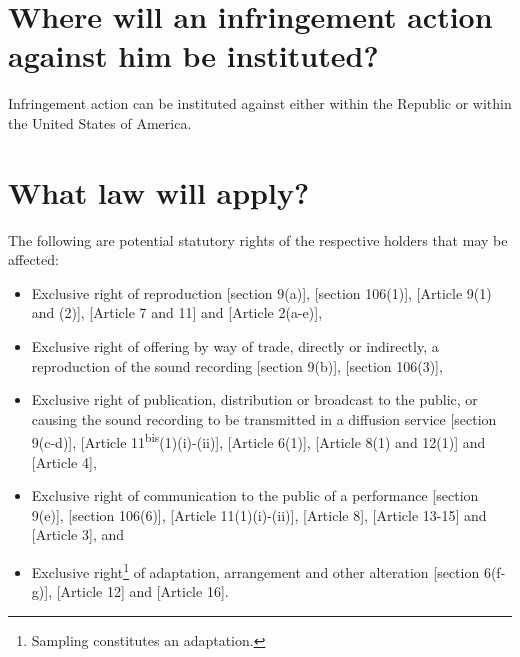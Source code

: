 \documentclass[11pt]{article}
\begin{document}
\section{Where will an infringement action against him be instituted?}
\label{sec:org951b8a3}
Infringement action can be instituted against either within the Republic or within the United States of America.

\section{What law will apply?}
\label{sec:orgd1eec0c}
The following are potential statutory rights of the respective holders that may be affected:

\begin{itemize}
\item Exclusive right of reproduction [section 9(a)]\cite{rsa78_copyrightact},
[section 106(1)]\cite{usa76_title17_us_copyright_act}, [Article 9(1) and
(2)]\cite{wipo86_berne}, [Article 7 and 11]\cite{wipo96_wppt} and [Article
2(a-e)]\cite{eurlex01_harmonisation},

\item Exclusive right of offering by way of trade, directly or indirectly, a
reproduction of the sound recording [section 9(b)]\cite{rsa78_copyrightact}, [section 106(3)]\cite{usa76_title17_us_copyright_act},

\item Exclusive right of publication, distribution or broadcast to the public, or
causing the sound recording to be transmitted in a diffusion service [section
9(c-d)]\cite{rsa78_copyrightact}, [Article
11\textsuperscript{bis}(1)(i)-(ii)]\cite{wipo86_berne}, [Article
6(1)]\cite{wipo96_copyright_treaty}, [Article 8(1) and 12(1)]\cite{wipo96_wppt}
and [Article 4]\cite{eurlex01_harmonisation},

\item Exclusive right of communication to the public of a performance [section
9(e)]\cite{rsa78_copyrightact}, [section
106(6)]\cite{usa76_title17_us_copyright_act}, [Article
11(1)(i)-(ii)]\cite{wipo86_berne}, [Article 8]\cite{wipo96_copyright_treaty},
[Article 13-15]\cite{wipo96_wppt} and [Article 3]\cite{eurlex01_harmonisation},
and

\item Exclusive right\footnote{Sampling constitutes an adaptation.} of adaptation,
arrangement and other alteration [section 6(f-g)]\cite{rsa78_copyrightact},
[Article 12]\cite{wipo86_berne} and [Article 16]\cite{wipo96_wppt}.
\end{itemize}

\printbibliography
\end{document}
